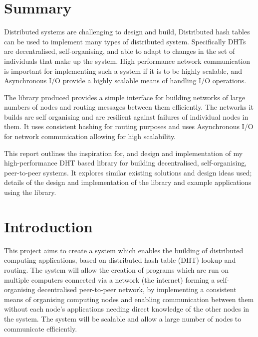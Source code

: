 \documentclass{article}
\begin{document}
\section*{Summary}
{
Distributed systems are challenging to design and build, Distributed hash tables can be used to implement many types of distributed system. Specifically DHTs are decentralised, self-organising, and able to adapt to changes in the set of individuals that make up the system. High performance network communication is important for implementing such a system if it is to be highly scalable, and Asynchronous I/O provide a highly scalable means of handling I/O operations.

The library produced provides a simple interface for building networks of large numbers of nodes and routing messages between them efficiently. The networks it builds are self organising and are resilient against failures of individual nodes in them. It uses consistent hashing for routing purposes and uses Asynchronous I/O for network communication allowing for high scalability.

This report outlines the inspiration for, and design and implementation of my high-performance DHT based library for building decentralised, self-organising, peer-to-peer systems. It explores similar existing solutions and design ideas used; details of the design and implementation of the library and example applications using the library.

}
\restoregeometry
\newpage
\tableofcontents
\newpage


\section{Introduction}

This project aims to create a system which enables the building of distributed computing applications, based on distributed hash table (DHT) lookup and routing. The system will allow the creation of programs which are run on multiple computers connected via a network (the internet) forming a self-organising decentralised peer-to-peer network, by implementing a consistent means of organising computing nodes and enabling communication between them without each node's applications needing direct knowledge of the other nodes in the system.
The system will be scalable and allow a large number of nodes to communicate efficiently.
\end{document}
